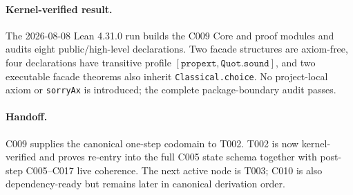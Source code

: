 \paragraph*{Kernel-verified result.}
The 2026-08-08 Lean 4.31.0 run builds the C009 Core and proof modules and audits
eight public/high-level declarations.  Two facade structures are axiom-free,
four declarations have transitive profile
$[\texttt{propext},\texttt{Quot.sound}]$, and two executable facade theorems
also inherit \texttt{Classical.choice}.  No project-local axiom or
\texttt{sorryAx} is introduced; the complete package-boundary audit passes.

\paragraph*{Handoff.}
C009 supplies the canonical one-step codomain to T002.  T002 is now kernel-
verified and proves re-entry into the full C005 state schema together with
post-step C005--C017 live coherence.  The next active node is T003; C010 is
also dependency-ready but remains later in canonical derivation order.
